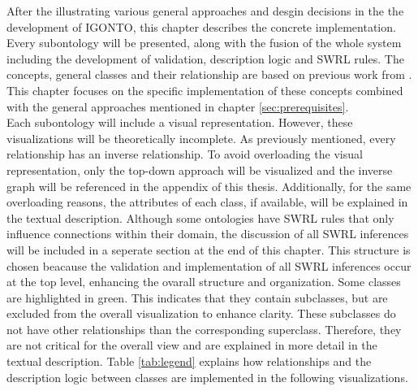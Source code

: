 \documentclass[
  a4paper,  %
  twoside,  %
  bibliography=totoc,
  headsepline,
  cleardoublepage=empty,
  parskip=half,
  draft=false
]{scrbook}
\begin{document}
After the illustrating various general approaches and desgin decisions in the the development of IGONTO, this chapter describes the concrete implementation. Every subontology will be presented, along with the fusion of the whole system including the development of validation, description logic and \acrshort{SWRL} rules. The concepts, general classes and their relationship are based on previous work from \cite{IGONTO}. This chapter focuses on the specific implementation of these concepts combined with the general approaches mentioned in chapter \ref{sec:prerequisites}. \\
Each subontology will include a visual representation. However, these visualizations will be theoretically incomplete. As previously mentioned, every relationship has an inverse relationship. To avoid overloading the visual representation, only the top-down approach will be visualized and the inverse graph will be referenced in the appendix of this thesis. Additionally, for the same overloading reasons, the attributes of each class, if available, will be explained in the textual description. Although some ontologies have SWRL rules that only influence connections within their domain, the discussion of all \acrshort{SWRL} inferences will be included in a seperate section at the end of this chapter. This structure is chosen beacause the validation and implementation of all SWRL inferences occur at the top level, enhancing the ovarall structure and organization. Some classes are highlighted in green. This indicates that they contain subclasses, but are excluded from the overall visualization to enhance clarity. These subclasses do not have other relationships than the corresponding superclass. Therefore, they are not critical for the overall view and are explained in more detail in the textual description. Table \ref{tab:legend} explains how relationships and the description logic between classes are implemented in the following visualizations. \\
\end{document}
